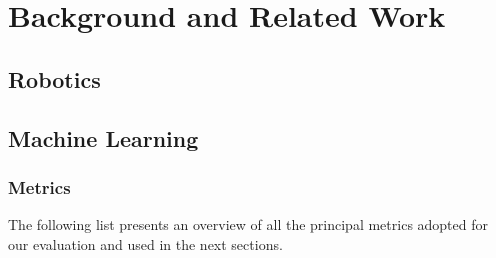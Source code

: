\chapter{Background and Related Work}
\label{chap:theory}




\section{Robotics}
\label{sec:robotics}

%




\section{Machine Learning}
\label{sec:machine-learning}


\subsection{Metrics}
\label{subsec:metrics}

The following list presents an overview of all the principal metrics adopted for our evaluation and used in the next sections.


